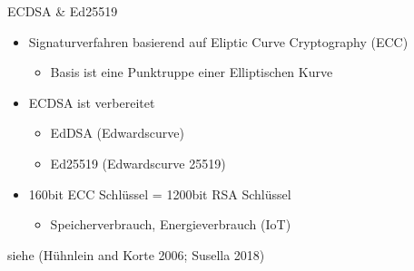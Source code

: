 \begin{frame}{ECDSA \& Ed25519}
\protect\hypertarget{ecdsa-ed25519}{}
\begin{itemize}
\tightlist
\item
  Signaturverfahren basierend auf Eliptic Curve Cryptography (ECC)

  \begin{itemize}
  \tightlist
  \item
    Basis ist eine Punktruppe einer Elliptischen Kurve
  \end{itemize}
\end{itemize}

\pause

\begin{itemize}
\item
  ECDSA ist verbereitet

  \pause

  \begin{itemize}
  \tightlist
  \item
    EdDSA (Edwardscurve)
  \end{itemize}

  \pause

  \begin{itemize}
  \tightlist
  \item
    Ed25519 (Edwardscurve 25519)
  \end{itemize}

  \pause
\item
  160bit ECC Schlüssel = 1200bit RSA Schlüssel

  \begin{itemize}
  \tightlist
  \item
    Speicherverbrauch, Energieverbrauch (IoT)
  \end{itemize}
\end{itemize}

siehe (Hühnlein and Korte 2006; Susella 2018)
\end{frame}

